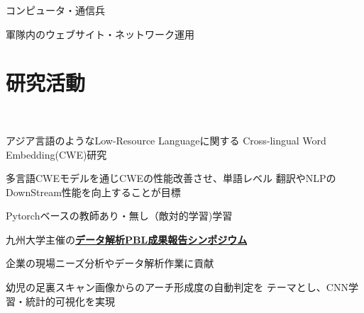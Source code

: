 \documentclass[]{deedy-resume-openfont}
\begin{document}
\begin{minipage}[t]{0.44\textwidth}
\begin{tightemize}
\item コンピュータ・通信兵
\item 軍隊内のウェブサイト・ネットワーク運用
\end{tightemize}



%
%

\end{minipage} 
\hfill
\begin{minipage}[t]{0.55\textwidth} 


\section{研究活動}
\\
\vspace{\topsep} %
\begin{tightemize}
\item アジア言語のようなLow-Resource Languageに関する
Cross-lingual Word Embedding(CWE)研究
\item 多言語CWEモデルを通じCWEの性能改善させ、単語レベル
翻訳やNLPのDownStream性能を向上することが目標
\item Pytorchベースの教師あり・無し（敵対的学習)学習
\end{tightemize}
\sectionsep


\begin{tightemize}
\item 九州大学主催の\textbf{\href{https://ads.i.kyushu-u.ac.jp/archives/1642}{データ解析PBL成果報告シンポジウム}}
\item 企業の現場ニーズ分析やデータ解析作業に貢献
\item 幼児の足裏スキャン画像からのアーチ形成度の自動判定を
テーマとし、CNN学習・統計的可視化を実現
\end{tightemize}
\sectionsep




\end{minipage}
\end{document}

